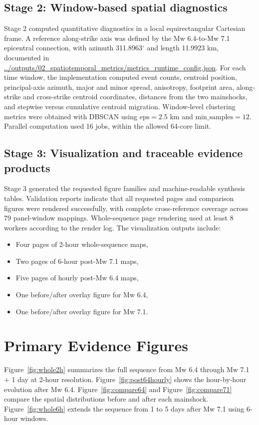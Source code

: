 \documentclass[11pt]{article}
\begin{document}
\subsection{Stage 2: Window-based spatial diagnostics}
Stage 2 computed quantitative diagnostics in a local equirectangular Cartesian frame. A reference along-strike axis was defined by the Mw 6.4-to-Mw 7.1 epicentral connection, with azimuth 311.8963$^{\circ}$ and length 11.9923 km, documented in
\url{../outputs/02_spatiotemporal_metrics/metrics_runtime_config.json}.
For each time window, the implementation computed event counts, centroid position, principal-axis azimuth, major and minor spread, anisotropy, footprint area, along-strike and cross-strike centroid coordinates, distances from the two mainshocks, and stepwise versus cumulative centroid migration. Window-level clustering metrics were obtained with DBSCAN using $\mathrm{eps}=2.5$ km and $\mathrm{min\_samples}=12$. Parallel computation used 16 jobs, within the allowed 64-core limit.

\subsection{Stage 3: Visualization and traceable evidence products}
Stage 3 generated the requested figure families and machine-readable synthesis tables. Validation reports indicate that all requested pages and comparison figures were rendered successfully, with complete cross-reference coverage across 79 panel-window mappings. Whole-sequence page rendering used at least 8 workers according to the render log. The visualization outputs include:
\begin{itemize}[leftmargin=1.5em]
    \item Four pages of 2-hour whole-sequence maps,
    \item Two pages of 6-hour post-Mw 7.1 maps,
    \item Five pages of hourly post-Mw 6.4 maps,
    \item One before/after overlay figure for Mw 6.4,
    \item One before/after overlay figure for Mw 7.1.
\end{itemize}

\section{Primary Evidence Figures}
Figure~\ref{fig:whole2h} summarizes the full sequence from Mw 6.4 through Mw 7.1 + 1 day at 2-hour resolution. Figure~\ref{fig:post64hourly} shows the hour-by-hour evolution after Mw 6.4. Figure~\ref{fig:compare64} and Figure~\ref{fig:compare71} compare the spatial distributions before and after each mainshock. Figure~\ref{fig:whole6h} extends the sequence from 1 to 5 days after Mw 7.1 using 6-hour windows.
\end{document}
